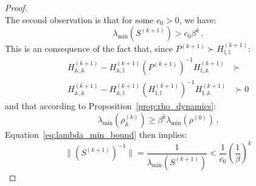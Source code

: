 \documentclass[letterpaper, 10 pt, conference]{ieeeconf}  %
\begin{document}
\begin{proof}
\\
The second observation is that for some $c_0 > 0$, we have:
\begin{equation}
\label{eq:lambda_min_bound}
    \lambda_{\min}\left(S^{(k+1)}\right) > c_0 \beta^{k} \,.
\end{equation}
This is an consequence of the fact that, since $P^{(k+1)} \succ H_{\mathbb{I},\mathbb{I}}^{(k+1)}$:
\begin{equation}
\begin{aligned}
    H_{\mathbb{A},\mathbb{A}}^{(k+1)} - H^{(k+1)}_{\mathbb{A}, \mathbb{I}} (P^{(k+1)})^{-1} H_{\mathbb{I},\mathbb{A}}^{(k+1)} &\succ \\
    H_{\mathbb{A},\mathbb{A}}^{(k+1)} - H^{(k+1)}_{\mathbb{A}, \mathbb{I}} (H_{\mathbb{I}, \mathbb{I}}^{(k+1)})^{-1} H_{\mathbb{I},\mathbb{A}}^{(k+1)} &\succ 0
\end{aligned}
\end{equation}
and that according to Proposition~\ref{prop:rho_dynamics}:
\begin{equation}
    \lambda_{\min}\left(\rho_\mathbb{A}^{(k)}\right) \ge \beta^k \lambda_{\min}\left(\rho^{(0)}\right) \,.
\end{equation}
Equation~\eqref{eq:lambda_min_bound} then implies:
\begin{equation}
    \|\left(S^{(k+1)}\right)^{-1}\| = \frac{1}{\lambda_{\min}\left(S^{(k+1)}\right)} < \frac{1}{c_0} \left(\frac{1}{\beta}\right)^{k}
\end{equation}


\end{proof}
\end{document}

